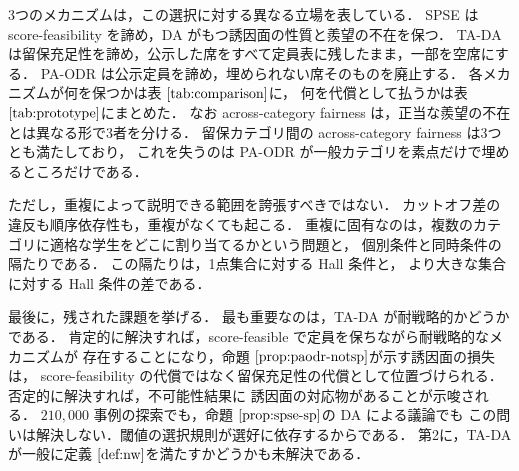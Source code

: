 \documentclass[
    12pt,          %
    a4paper,       %
    oneside,       %
    onecolumn,     %
    titlepage,     %
    final          %
]{jreport} %
\makeatletter
\renewcommand{\chapter}{
    \if@openright\cleardoublepage\else\clearpage\fi
    \global\@topnum\z@
    \secdef\@chapter\@schapter
}
\newcommand{\reftable}[1]{表 $\ref{#1}$}
\newcommand{\refdefinition}[1]{定義 $\ref{#1}$}
\newcommand{\refpropositional}[1]{命題 $\ref{#1}$}
\makeatother
\begin{document}
3つのメカニズムは，この選択に対する異なる立場を表している．
SPSE は score-feasibility を諦め，DA がもつ誘因面の性質と羨望の不在を保つ．
TA-DA は留保充足性を諦め，公示した席をすべて定員表に残したまま，一部を空席にする．
PA-ODR は公示定員を諦め，埋められない席そのものを廃止する．
各メカニズムが何を保つかは\reftable{tab:comparison}に，
何を代償として払うかは\reftable{tab:prototype}にまとめた．
なお across-category fairness は，正当な羨望の不在とは異なる形で3者を分ける．
留保カテゴリ間の across-category fairness は3つとも満たしており，
これを失うのは PA-ODR が一般カテゴリを素点だけで埋めるところだけである．

ただし，重複によって説明できる範囲を誇張すべきではない．
カットオフ差の違反も順序依存性も，重複がなくても起こる．
重複に固有なのは，複数のカテゴリに適格な学生をどこに割り当てるかという問題と，
個別条件と同時条件の隔たりである．
この隔たりは，1点集合に対する Hall 条件と，
より大きな集合に対する Hall 条件の差である．

最後に，残された課題を挙げる．
最も重要なのは，TA-DA が耐戦略的かどうかである．
肯定的に解決すれば，score-feasible で定員を保ちながら耐戦略的なメカニズムが
存在することになり，\refpropositional{prop:paodr-notsp}が示す誘因面の損失は，
score-feasibility の代償ではなく留保充足性の代償として位置づけられる．
否定的に解決すれば，不可能性結果に
誘因面の対応物があることが示唆される．
$210{,}000$ 事例の探索でも，\refpropositional{prop:spse-sp}の DA による議論でも
この問いは解決しない．閾値の選択規則が選好に依存するからである．
第2に，TA-DA が一般に\refdefinition{def:nw}を満たすかどうかも未解決である．








\end{document}
